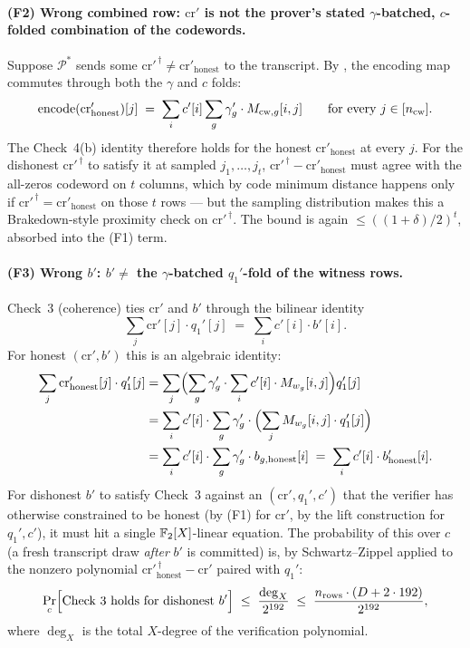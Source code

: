 \paragraph{(F2) Wrong combined row: $\mathrm{cr}'$ is not the
prover's stated $\gamma$-batched, $c$-folded combination of the
codewords.} Suppose $\mathcal{P}^*$ sends some
$\mathrm{cr}'^{\,\dagger} \ne \mathrm{cr}'_{\mathrm{honest}}$ to the
transcript. By , the encoding map commutes
through both the $\gamma$ and $c$ folds:
\[
  \operatorname{encode}(\mathrm{cr}'_{\mathrm{honest}})[j]
  \;=\;
  \sum_i c'[i] \sum_g \gamma_g' \cdot M_{\mathrm{cw}, g}[i, j]
  \qquad \text{for every } j \in [n_{\mathrm{cw}}].
\]
The Check~4(b) identity therefore holds for the honest
$\mathrm{cr}'_{\mathrm{honest}}$ at every $j$. For the dishonest
$\mathrm{cr}'^{\,\dagger}$ to satisfy it at sampled $j_1, \ldots, j_t$,
$\mathrm{cr}'^{\,\dagger} - \mathrm{cr}'_{\mathrm{honest}}$ must
agree with the all-zeros codeword on $t$ columns, which by code
minimum distance happens only if
$\mathrm{cr}'^{\,\dagger} = \mathrm{cr}'_{\mathrm{honest}}$ on those
$t$ rows — but the sampling distribution makes this a Brakedown-style
proximity check on $\mathrm{cr}'^{\,\dagger}$. The bound is again
$\le ((1+\delta)/2)^t$, absorbed into the (F1) term.

\paragraph{(F3) Wrong $b'$: $b' \ne$ the $\gamma$-batched
$q_1'$-fold of the witness rows.} Check~3 (coherence) ties
$\mathrm{cr}'$ and $b'$ through the bilinear identity
\[
  \sum_j \mathrm{cr}'[j] \cdot q_1'[j]
  \;=\;
  \sum_i c'[i] \cdot b'[i].
\]
For honest $(\mathrm{cr}', b')$ this is an algebraic identity:
\begin{align*}
  \sum_j \mathrm{cr}'_{\mathrm{honest}}[j] \cdot q_1'[j]
  &= \sum_j \Bigl( \sum_g \gamma_g' \cdot \sum_i c'[i] \cdot M_{w_g}[i, j] \Bigr) q_1'[j] \\
  &= \sum_i c'[i] \cdot \sum_g \gamma_g' \cdot \Bigl(\sum_j M_{w_g}[i, j] \cdot q_1'[j]\Bigr) \\
  &= \sum_i c'[i] \cdot \sum_g \gamma_g' \cdot b_{g, \mathrm{honest}}[i]
  \;=\; \sum_i c'[i] \cdot b'_{\mathrm{honest}}[i].
\end{align*}
For dishonest $b'$ to satisfy Check~3 against an
$(\mathrm{cr}', q_1', c')$ that the verifier has otherwise
constrained to be honest (by (F1) for $\mathrm{cr}'$, by the lift
construction for $q_1', c'$), it must hit a single $\mathbb{F}_2[X]$-linear
equation. The probability of this over $c$ (a fresh transcript draw
\emph{after} $b'$ is committed) is, by Schwartz–Zippel applied to the
nonzero polynomial $\mathrm{cr}'^{\,\dagger}_{\mathrm{honest}} -
\mathrm{cr}'$ paired with $q_1'$:
\[
  \Pr_c\Bigl[\text{Check~3 holds for dishonest } b'\Bigr]
  \;\le\;
  \frac{\deg_X}{2^{192}}
  \;\le\;
  \frac{n_{\mathrm{rows}} \cdot (D + 2 \cdot 192)}{2^{192}},
\]
where $\deg_X$ is the total $X$-degree of the verification polynomial.

